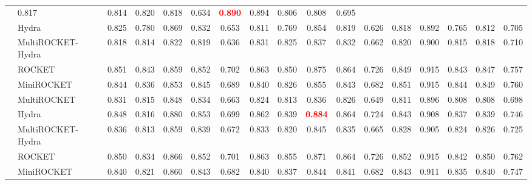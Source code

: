 \begin{table}[tbp]
{\begin{tabular}{llccccc|ccccc|ccccc}
              & 0.817 & 0.814 & 0.820 & 0.818 & 0.634  
              & \textcolor{red}{\textbf{0.890}} & 0.894 & 0.806 & 0.808 & 0.695 \\
              & Hydra
              & 0.825 & 0.780 & 0.869 & 0.832 & 0.653  
              & 0.811 & 0.769 & 0.854 & 0.819 & 0.626  
              & 0.818 & 0.892 & 0.765 & 0.812 & 0.705 \\
              & MultiROCKET-Hydra
              & 0.818 & 0.814 & 0.822 & 0.819 & 0.636  
              & 0.831 & 0.825 & 0.837 & 0.832 & 0.662  
              & 0.820 & 0.900 & 0.815 & 0.818 & 0.710 \\
\midrule
{} 
              & ROCKET  
              & 0.851 & 0.843 & 0.859 & 0.852 & 0.702  
              & 0.863 & 0.850 & 0.875 & 0.864 & 0.726  
              & 0.849 & 0.915 & 0.843 & 0.847 & 0.757 \\
              & MiniROCKET 
              & 0.844 & 0.836 & 0.853 & 0.845 & 0.689  
              & 0.840 & 0.826 & 0.855 & 0.843 & 0.682  
              & 0.851 & 0.915 & 0.844 & 0.849 & 0.760 \\
              & MultiROCKET
              & 0.831 & 0.815 & 0.848 & 0.834 & 0.663  
              & 0.824 & 0.813 & 0.836 & 0.826 & 0.649  
              & 0.811 & 0.896 & 0.808 & 0.808 & 0.698 \\
              & Hydra
              & 0.848 & 0.816 & 0.880 & 0.853 & 0.699  
              & 0.862 & 0.839 & \textcolor{red}{\textbf{0.884}} & 0.864 & 0.724  
              & 0.843 & 0.908 & 0.837 & 0.839 & 0.746 \\
              & MultiROCKET-Hydra
              & 0.836 & 0.813 & 0.859 & 0.839 & 0.672  
              & 0.833 & 0.820 & 0.845 & 0.835 & 0.665  
              & 0.828 & 0.905 & 0.824 & 0.826 & 0.725 \\
\midrule
{} 
              & ROCKET  
              & 0.850 & 0.834 & 0.866 & 0.852 & 0.701  
              & 0.863 & 0.855 & 0.871 & 0.864 & 0.726  
              & 0.852 & 0.915 & 0.842 & 0.850 & 0.762 \\
              & MiniROCKET 
              & 0.840 & 0.821 & 0.860 & 0.843 & 0.682  
              & 0.840 & 0.837 & 0.844 & 0.841 & 0.682  
              & 0.843 & 0.911 & 0.835 & 0.840 & 0.747 \\

\end{tabular}}
\end{table}
